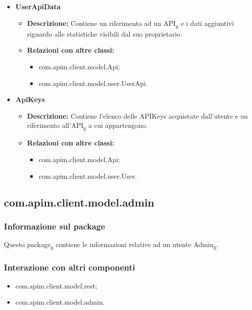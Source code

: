 {{{\begin{itemize}
\begin{itemize}
						\begin{itemize}
							\item com.apim.client.model.user.UserApiData.
						\end{itemize}
					\end{itemize}
				\item \textbf{UserApiData}
					\begin{itemize}
						\item \textbf{Descrizione:} Contiene un riferimento ad un API\textsubscript{g} e i dati aggiuntivi riguardo alle statistiche visibili dal suo proprietario.
						\item \textbf{Relazioni con altre classi:}
						\begin{itemize}
							\item com.apim.client.model.Api;
							\item com.apim.client.model.user.UserApi.
						\end{itemize}
					\end{itemize}
				\item \textbf{ApiKeys}
					\begin{itemize}
						\item \textbf{Descrizione:} Contiene l'elenco delle APIKeys acquistate dall'utente e un riferimento all'API\textsubscript{g} a cui appartengono.
						\item \textbf{Relazioni con altre classi:}
						\begin{itemize}
							\item com.apim.client.model.Api;
							\item com.apim.client.model.user.User.
						\end{itemize}
					\end{itemize}
			\end{itemize}
		}
	}
	\subsection{com.apim.client.model.admin}{
		\subsubsection{Informazione sul package}{
			Questo package\textsubscript{g} contiene le informazioni relative ad un utente Admin\textsubscript{g}.
		}
		\subsubsection{Interazione con altri componenti}{
			\begin{itemize}
				\item com.apim.client.model.rest;
				\item com.apim.client.model.admin.
			\end{itemize}
		}
}}
